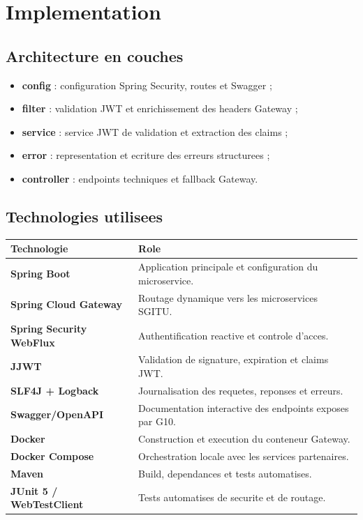 \documentclass[12pt, a4paper]{article}
\begin{document}
\section{Implementation}

\subsection{Architecture en couches}

\begin{itemize}
  \item \textbf{config} : configuration Spring Security, routes et Swagger ;
  \item \textbf{filter} : validation JWT et enrichissement des headers Gateway ;
  \item \textbf{service} : service JWT de validation et extraction des claims ;
  \item \textbf{error} : representation et ecriture des erreurs structurees ;
  \item \textbf{controller} : endpoints techniques et fallback Gateway.
\end{itemize}

\subsection{Technologies utilisees}

\begin{center}
\begin{tabular}{>{\bfseries}p{4cm} p{8.5cm}}
\rowcolor{navyblue}
\color{white}\textbf{Technologie} & \color{white}\textbf{Role} \\
\hline
Spring Boot & Application principale et configuration du microservice. \\
\rowcolor{lightgray}
Spring Cloud Gateway & Routage dynamique vers les microservices SGITU. \\
Spring Security WebFlux & Authentification reactive et controle d'acces. \\
\rowcolor{lightgray}
JJWT & Validation de signature, expiration et claims JWT. \\
SLF4J + Logback & Journalisation des requetes, reponses et erreurs. \\
\rowcolor{lightgray}
Swagger/OpenAPI & Documentation interactive des endpoints exposes par G10. \\
Docker & Construction et execution du conteneur Gateway. \\
\rowcolor{lightgray}
Docker Compose & Orchestration locale avec les services partenaires. \\
Maven & Build, dependances et tests automatises. \\
\rowcolor{lightgray}
JUnit 5 / WebTestClient & Tests automatises de securite et de routage. \\
\end{tabular}
\end{center}
\end{document}
